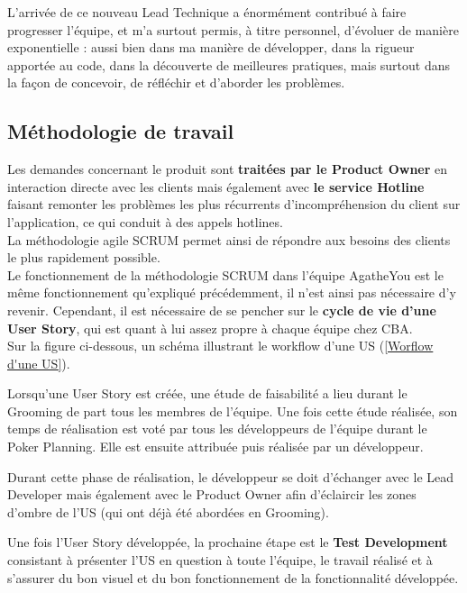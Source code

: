\documentclass{article}
\begin{document}
L'arrivée de ce nouveau Lead Technique a énormément contribué à faire progresser l'équipe, et m'a surtout permis, à titre personnel, d'évoluer de manière exponentielle : aussi bien dans ma manière de développer, dans la rigueur apportée au code, dans la découverte de meilleures pratiques, mais surtout dans la façon de concevoir, de réfléchir et d'aborder les problèmes.

\newpage

\subsection{Méthodologie de travail}

Les demandes concernant le produit sont \textbf{traitées par le Product Owner} en interaction directe avec les clients mais également avec \textbf{le service Hotline} faisant remonter les problèmes les plus récurrents d'incompréhension du client sur l'application, ce qui conduit à des appels hotlines. \\

La méthodologie agile SCRUM permet ainsi de répondre aux besoins des clients le plus rapidement possible. \\

Le fonctionnement de la méthodologie SCRUM dans l'équipe AgatheYou est le même fonctionnement qu'expliqué précédemment, il n'est ainsi pas nécessaire d'y revenir. Cependant, il est nécessaire de se pencher sur le \textbf{cycle de vie d'une User Story}, qui est quant à lui assez propre à chaque équipe chez CBA. \\

Sur la figure ci-dessous, un schéma illustrant le workflow d'une US (\ref{Worflow d'une US}).


Lorsqu'une User Story est créée, une étude de faisabilité a lieu durant le Grooming de part tous les membres de l'équipe. Une fois cette étude réalisée, son temps de réalisation est voté par tous les développeurs de l'équipe durant le Poker Planning. Elle est ensuite attribuée puis réalisée par un développeur.

Durant cette phase de réalisation, le développeur se doit d'échanger avec le Lead Developer mais également avec le Product Owner afin d'éclaircir les zones d'ombre de l'US (qui ont déjà été abordées en Grooming).

Une fois l'User Story développée, la prochaine étape est le \textbf{Test Development} consistant à présenter l'US en question à toute l'équipe, le travail réalisé et à s'assurer du bon visuel et du bon fonctionnement de la fonctionnalité développée.
\end{document}
